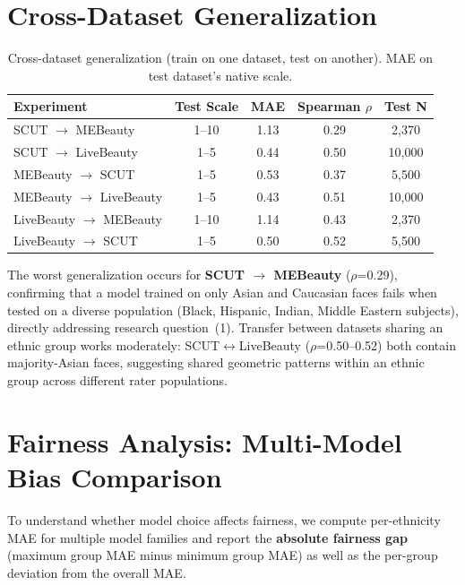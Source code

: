 \documentclass[a4paper,oneside,bibliography=totoc]{scrbook}
\begin{document}
\section{Cross-Dataset Generalization}

\begin{table}[h]
\centering
\caption{Cross-dataset generalization (train on one dataset, test on another). MAE on test dataset's native scale.}
\label{tab:crossdataset}
\begin{tabular}{lcccc}
\toprule
\textbf{Experiment} & \textbf{Test Scale} & \textbf{MAE} & \textbf{Spearman $\rho$} & \textbf{Test N} \\
\midrule
SCUT $\rightarrow$ MEBeauty & 1--10 & 1.13 & 0.29 & 2,370 \\
SCUT $\rightarrow$ LiveBeauty & 1--5 & 0.44 & 0.50 & 10,000 \\
MEBeauty $\rightarrow$ SCUT & 1--5 & 0.53 & 0.37 & 5,500 \\
MEBeauty $\rightarrow$ LiveBeauty & 1--5 & 0.43 & 0.51 & 10,000 \\
LiveBeauty $\rightarrow$ MEBeauty & 1--10 & 1.14 & 0.43 & 2,370 \\
LiveBeauty $\rightarrow$ SCUT & 1--5 & 0.50 & 0.52 & 5,500 \\
\bottomrule
\end{tabular}
\end{table}

The worst generalization occurs for \textbf{SCUT $\rightarrow$ MEBeauty} ($\rho$=0.29), confirming that a model trained on only Asian and Caucasian faces fails when tested on a diverse population (Black, Hispanic, Indian, Middle Eastern subjects), directly addressing research question~(1). Transfer between datasets sharing an ethnic group works moderately: SCUT$\leftrightarrow$LiveBeauty ($\rho$=0.50--0.52) both contain majority-Asian faces, suggesting shared geometric patterns within an ethnic group across different rater populations.\\

\section{Fairness Analysis: Multi-Model Bias Comparison}

To understand whether model choice affects fairness, we compute per-ethnicity MAE for multiple model families and report the \textbf{absolute fairness gap} (maximum group MAE minus minimum group MAE) as well as the per-group deviation from the overall MAE.\\
\end{document}
